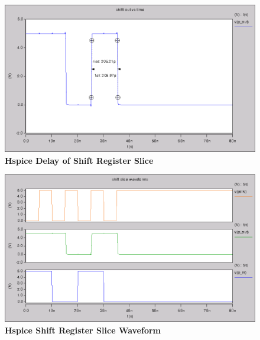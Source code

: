 \documentclass[a4paper]{article}
\begin{document}
    \begin{figure}[H]
        \centering
        \includegraphics[width=\textwidth,height=\textheight,keepaspectratio]{../../cscope/shift_delay.png}
        \caption{\textbf{Hspice Delay of Shift Register Slice}}
        \label{fig:gg}
    \end{figure}
    \begin{figure}[H]
        \centering
        \includegraphics[width=\textwidth,height=\textheight,keepaspectratio]{../../cscope/shift_waveforms.png}
        \caption{\textbf{Hspice Shift Register Slice Waveform}}
        \label{fig:gg}
    \end{figure}

\end{document}

